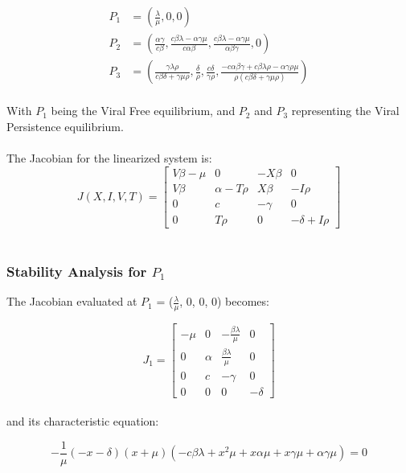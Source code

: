 \documentclass{article}
\begin{document}
\begin{equation}
	\begin{split}
		P_{1} &= (\frac{\lambda}{\mu}, 0, 0)\\	
		P_{2} &= (\frac{\alpha \gamma}{c \beta}, \frac{c  \beta \lambda - \alpha \gamma \mu}{c \alpha \beta}, \frac{c \beta \lambda - \alpha \gamma \mu}{\alpha \beta \gamma}, 0)\\
		P_{3} &= (\frac{\gamma \lambda \rho}{c \beta \delta + \gamma \mu \rho}, \frac{\delta}{\rho}, \frac{c \delta}{\gamma \rho}, \frac{-c \alpha \beta \gamma + c \beta \lambda \rho - \alpha \gamma \rho \mu}{\rho (c \beta \delta + \gamma \mu \rho)})\\
	\end{split}
\end{equation}

With $P_{1}$ being the Viral Free equilibrium, and $P_{2}$ and $P_{3}$ representing the Viral Persistence equilibrium.\\
\\
The Jacobian for the linearized system is:\\

\[J(X, I, V, T) =
	\begin{bmatrix}
		V \beta - \mu & 0 & -X \beta & 0 \\
		V \beta & \alpha - T \rho & X \beta & -I \rho \\
		0 & c & - \gamma & 0 \\
		0 & T \rho & 0 & - \delta + I \rho
	\end{bmatrix}
				\]\\

\subsubsection{Stability Analysis for $P_{1}$}

The Jacobian evaluated at $P_{1}$ = ($\frac{\lambda}{\mu}$, 0, 0, 0) becomes:

\[J_{1} =
	\begin{bmatrix}
		- \mu & 0 & - \frac{\beta \lambda}{\mu} & 0 \\
		0 & \alpha & \frac{\beta \lambda}{\mu} & 0 \\
		0 & c & - \gamma & 0 \\
		0 & 0 & 0 & - \delta
	\end{bmatrix}
\]\\

and its characteristic equation:

\begin{equation}
	- \frac{1}{\mu}(-x - \delta)(x + \mu)(-c \beta \lambda + x^2 \mu + x \alpha \mu + x \gamma \mu + \alpha \gamma \mu) = 0
\end{equation}
\end{document}

